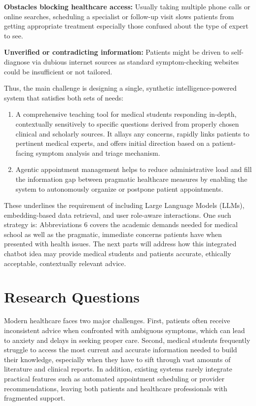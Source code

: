 \noindent \textbf{Obstacles blocking healthcare access:} Usually taking multiple phone calls or online searches, scheduling a specialist or follow-up visit slows patients from getting appropriate treatment especially those confused about the type of expert to see.

\noindent \textbf{Unverified or contradicting information:} Patients might be driven to self-diagnose via dubious internet sources as standard symptom-checking websites could be insufficient or not tailored.

Thus, the main challenge is designing a single, synthetic intelligence-powered system that satisfies both sets of needs:
\begin{enumerate}
    \item A comprehensive teaching tool for medical students responding in-depth, contextually sensitively to specific questions derived from properly chosen clinical and scholarly sources. It allays any concerns, rapidly links patients to pertinent medical experts, and offers initial direction based on a patient-facing symptom analysis and triage mechanism.
    \item Agentic appointment management helps to reduce administrative load and fill the information gap between pragmatic healthcare measures by enabling the system to autonomously organize or postpone patient appointments.
\end{enumerate}



These underlines the requirement of including Large Language Models (LLMs), embedding-based data retrieval, and user role-aware interactions. One such strategy is: Abbreviations 6 covers the academic demands needed for medical school as well as the pragmatic, immediate concerns patients have when presented with health issues. The next parts will address how this integrated chatbot idea may provide medical students and patients accurate, ethically acceptable, contextually relevant advice.


\section{Research Questions}
\label{sec:research-questions}

Modern healthcare faces two major challenges. First, patients often receive inconsistent advice when confronted with ambiguous symptoms, which can lead to anxiety and delays in seeking proper care. Second, medical students frequently struggle to access the most current and accurate information needed to build their knowledge, especially when they have to sift through vast amounts of literature and clinical reports. In addition, existing systems rarely integrate practical features such as automated appointment scheduling or provider recommendations, leaving both patients and healthcare professionals with fragmented support.

